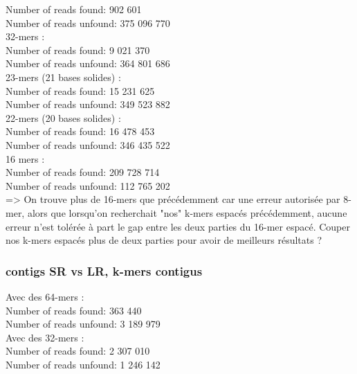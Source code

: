 \documentclass[12pt]{article}
\begin{document}
Number of reads found: 902 601 \\
Number of reads unfound: 375 096 770 \\ 

32-mers : \\

Number of reads found: 9 021 370 \\
Number of reads unfound: 364 801 686 \\

23-mers (21 bases solides) : \\

Number of reads found: 15 231 625 \\
Number of reads unfound: 349 523 882 \\

22-mers (20 bases solides) : \\

Number of reads found: 16 478 453 \\
Number of reads unfound: 346 435 522 \\

16 mers : \\

Number of reads found: 209 728 714 \\
Number of reads unfound: 112 765 202 \\

=> On trouve plus de 16-mers que précédemment car une erreur autorisée par 8-mer, alors que lorsqu'on recherchait "nos" k-mers espacés précédemment, aucune erreur n'est tolérée à part le gap entre les deux parties du 16-mer espacé. Couper nos k-mers espacés plus de deux parties pour avoir de meilleurs résultats ? 

\subsubsection{contigs SR vs LR, k-mers contigus}

Avec des 64-mers : \\

Number of reads found: 363 440 \\
Number of reads unfound: 3 189 979 \\

Avec des 32-mers : \\

Number of reads found: 2 307 010 \\
Number of reads unfound: 1 246 142 \\
\end{document}
